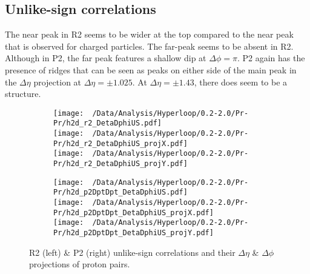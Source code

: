 \documentclass[12pt,a4paper,twoside]{report}
\begin{document}
\subsection{Unlike-sign correlations}
The near peak in R2 seems to be wider at the top compared to the near peak that is observed for charged particles. The far-peak seems to be absent in R2. Although in P2, the far peak features a shallow dip at $\Delta\phi=\pi$.
P2 again has the presence of ridges that can be seen as peaks on either side of the main peak in the $\Delta\eta$ projection at $\Delta\eta=\pm1.025$. At $\Delta\eta=\pm1.43$, there does seem to be a structure.
\begin{figure}[H]
	\begin{subfigure}{0.49\linewidth}
		\texttt{[image: ~/Data/Analysis/Hyperloop/0.2-2.0/Pr-Pr/h2d\_r2\_DetaDphiUS.pdf]}\\
		\texttt{[image: ~/Data/Analysis/Hyperloop/0.2-2.0/Pr-Pr/h2d\_r2\_DetaDphiUS\_projX.pdf]}\\
		\texttt{[image: ~/Data/Analysis/Hyperloop/0.2-2.0/Pr-Pr/h2d\_r2\_DetaDphiUS\_projY.pdf]}\\
	\end{subfigure}
	\begin{subfigure}{0.49\linewidth}
		\texttt{[image: ~/Data/Analysis/Hyperloop/0.2-2.0/Pr-Pr/h2d\_p2DptDpt\_DetaDphiUS.pdf]}\\
		\texttt{[image: ~/Data/Analysis/Hyperloop/0.2-2.0/Pr-Pr/h2d\_p2DptDpt\_DetaDphiUS\_projX.pdf]}\\
		\texttt{[image: ~/Data/Analysis/Hyperloop/0.2-2.0/Pr-Pr/h2d\_p2DptDpt\_DetaDphiUS\_projY.pdf]}\\
	\end{subfigure}
	\caption{R2 (left) \& P2 (right) unlike-sign correlations and their $\Delta\eta$ \& $\Delta\phi$ projections of proton pairs.}
\end{figure}
\end{document}
